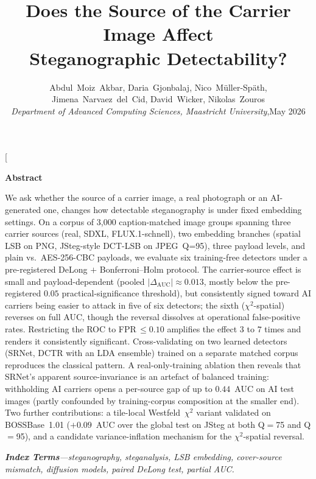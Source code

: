 \documentclass[10pt,twocolumn,a4paper]{article}
\title{\vspace{-1.4cm}\textbf{Does the Source of the Carrier Image Affect\\
Steganographic Detectability?}}
\author{\normalsize
Abdul~Moiz~Akbar,\quad
Daria~Gjonbalaj,\quad
Nico~M\"uller-Sp\"ath,\quad
Jimena~Narvaez~del~Cid,\quad
David~Wicker,\quad
Nikolas~Zouros\\[2pt]
\small \textit{Department of Advanced Computing Sciences, Maastricht University},\enskip May 2026}
\date{}
\begin{document}
\twocolumn[
\begin{@twocolumnfalse}
\maketitle
\thispagestyle{fancy}
\vspace{-0.8cm}
\begin{center}
\begin{minipage}{0.86\textwidth}\small
\begin{center}
\textbf{Abstract}
\end{center}
\noindent We ask whether the source of a carrier image, a real photograph or an AI-generated one, changes how detectable steganography is under fixed embedding settings. On a corpus of 3{,}000 caption-matched image groups spanning three carrier sources (real, SDXL, FLUX.1-schnell), two embedding branches (spatial LSB on PNG, JSteg-style DCT-LSB on JPEG~Q=95), three payload levels, and plain vs.\ AES-256-CBC payloads, we evaluate six training-free detectors under a pre-registered DeLong $+$ Bonferroni--Holm protocol. The carrier-source effect is small and payload-dependent (pooled $|\Delta_\text{AUC}|\!\approx\!0.013$, mostly below the pre-registered $0.05$ practical-significance threshold), but consistently signed toward AI carriers being easier to attack in five of six detectors; the sixth ($\chi^2$-spatial) reverses on full AUC, though the reversal dissolves at operational false-positive rates. Restricting the ROC to FPR\,$\leq\!0.10$ amplifies the effect $3$ to $7$ times and renders it consistently significant. Cross-validating on two learned detectors (SRNet, DCTR with an LDA ensemble) trained on a separate matched corpus reproduces the classical pattern. A real-only-training ablation then reveals that SRNet's apparent source-invariance is an artefact of balanced training: withholding AI carriers opens a per-source gap of up to $0.44$~AUC on AI test images (partly confounded by training-corpus composition at the smaller end). Two further contributions: a tile-local Westfeld~$\chi^2$ variant validated on BOSSBase~1.01 ($+0.09$~AUC over the global test on JSteg at both Q$=$75 and Q$=$95), and a candidate variance-inflation mechanism for the $\chi^2$-spatial reversal.

\smallskip
\noindent\textit{\textbf{Index Terms}---steganography, steganalysis, LSB embedding, cover-source mismatch, diffusion models, paired DeLong test, partial AUC.}




\end{minipage}
\end{center}
\end{@twocolumnfalse}
\end{document}
